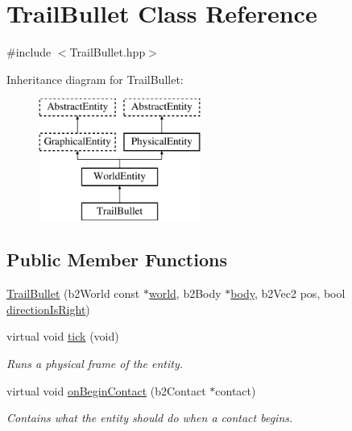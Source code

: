 \hypertarget{class_trail_bullet}{}\section{Trail\+Bullet Class Reference}
\label{class_trail_bullet}


{\ttfamily \#include $<$Trail\+Bullet.\+hpp$>$}

Inheritance diagram for Trail\+Bullet\+:\begin{figure}[H]
\begin{center}
\leavevmode
\includegraphics[height=4.000000cm]{class_trail_bullet}
\end{center}
\end{figure}
\subsection*{Public Member Functions}
\begin{DoxyCompactItemize}
\item 
\hyperlink{class_trail_bullet_a4eb109da5dd108d1174a7c1ddb7ca9e1}{Trail\+Bullet} (b2\+World const $\ast$\hyperlink{class_physical_entity_ae6c23c3817c4d7f9a867abed05cd7834}{world}, b2\+Body $\ast$\hyperlink{class_physical_entity_a91a5016393dd890c490b329abd938ec7}{body}, b2\+Vec2 pos, bool \hyperlink{class_trail_bullet_a20902ecccf91729dcc6e3e00fba5b420}{direction\+Is\+Right})
\item 
virtual void \hyperlink{class_trail_bullet_a3fe11738249bc471194e2eb207730911}{tick} (void)
\begin{DoxyCompactList}\small\item\em Runs a physical frame of the entity. \end{DoxyCompactList}\item 
virtual void \hyperlink{class_trail_bullet_adc085681d9e19e335c5ec083fc291a5f}{on\+Begin\+Contact} (b2\+Contact $\ast$contact)
\begin{DoxyCompactList}\small\item\em Contains what the entity should do when a contact begins. \end{DoxyCompactList}\end{DoxyCompactItemize}
